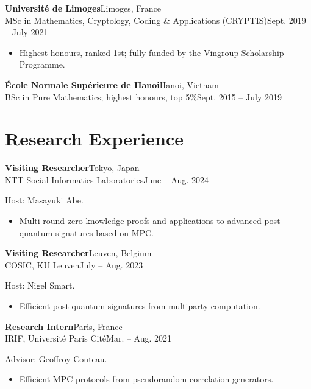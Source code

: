 \documentclass[11pt]{article}
\newcommand{\entry}[4]{%
  \needspace{3\baselineskip}%
  \noindent\textbf{#1}\hspace{1em}\hfill #2\\[0.15em]
  \noindent #3\hspace{1em}\hfill #4\par\vspace{0.45em}}
\begin{document}
\entry{Universit\'e de Limoges}{Limoges, France}
{MSc in Mathematics, Cryptology, Coding \& Applications (CRYPTIS)}{Sept. 2019 -- July 2021}
\vspace{-0.6em}
\begin{itemize}
      \item Highest honours, ranked 1st; fully funded by the Vingroup Scholarship Programme.
\end{itemize}
\vspace{0.45em}

\entry{\'Ecole Normale Sup\'erieure de Hanoi}{Hanoi, Vietnam}
{BSc in Pure Mathematics; highest honours, top 5\%}{Sept. 2015 -- July 2019}

\section{Research Experience}

\entry{Visiting Researcher}{Tokyo, Japan}
{NTT Social Informatics Laboratories}{June -- Aug. 2024}
\vspace{-0.45em}
\noindent Host: Masayuki Abe.\par\vspace{0.45em}
\vspace{-0.6em}
\begin{itemize}
      \item Multi-round zero-knowledge proofs and applications to advanced post-quantum
            signatures based on MPC.
\end{itemize}
\vspace{0.45em}

\entry{Visiting Researcher}{Leuven, Belgium}
{COSIC, KU Leuven}{July -- Aug. 2023}
\vspace{-0.45em}
\noindent Host: Nigel Smart.\par\vspace{0.45em}
\vspace{-0.6em}
\begin{itemize}
      \item Efficient post-quantum signatures from multiparty computation.
\end{itemize}
\vspace{0.45em}

\entry{Research Intern}{Paris, France}
{IRIF, Universit\'e Paris Cit\'e}{Mar. -- Aug. 2021}
\vspace{-0.45em}
\noindent Advisor: Geoffroy Couteau.\par\vspace{0.45em}
\vspace{-0.6em}
\begin{itemize}
      \item Efficient MPC protocols from pseudorandom correlation generators.
\end{itemize}
\vspace{0.45em}
\end{document}
